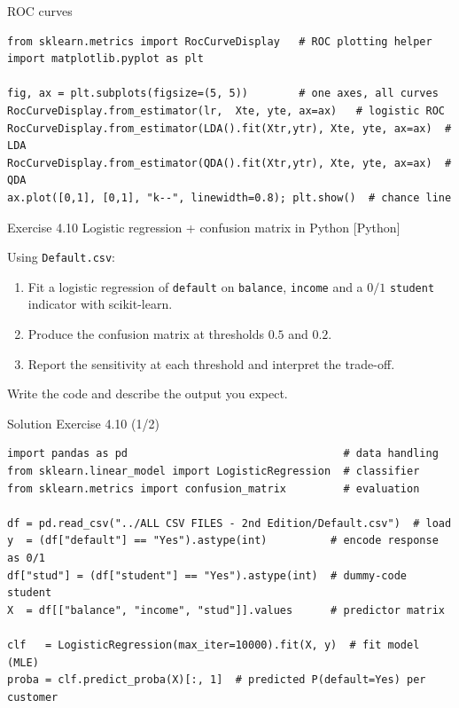 \documentclass[aspectratio=169,11pt]{beamer}
\begin{document}
\begin{frame}[fragile]{ROC curves}
  \begin{lstlisting}
from sklearn.metrics import RocCurveDisplay   # ROC plotting helper
import matplotlib.pyplot as plt

fig, ax = plt.subplots(figsize=(5, 5))        # one axes, all curves
RocCurveDisplay.from_estimator(lr,  Xte, yte, ax=ax)   # logistic ROC
RocCurveDisplay.from_estimator(LDA().fit(Xtr,ytr), Xte, yte, ax=ax)  # LDA
RocCurveDisplay.from_estimator(QDA().fit(Xtr,ytr), Xte, yte, ax=ax)  # QDA
ax.plot([0,1], [0,1], "k--", linewidth=0.8); plt.show()  # chance line
  \end{lstlisting}
\end{frame}




\begin{frame}{Exercise 4.10 \textemdash{} Logistic regression + confusion matrix in Python [Python]}
\begin{exercise}
Using \texttt{Default.csv}:
\begin{enumerate}
  \item Fit a logistic regression of \texttt{default} on
        \texttt{balance}, \texttt{income} and a $0/1$ \texttt{student}
        indicator with scikit-learn.
  \item Produce the confusion matrix at thresholds $0.5$ and $0.2$.
  \item Report the sensitivity at each threshold and interpret the
        trade-off.
\end{enumerate}
Write the code and describe the output you expect.
\end{exercise}
\end{frame}

\begin{frame}[fragile]{Solution \textemdash{} Exercise 4.10 (1/2)}
\begin{solutionbox}
\begin{lstlisting}
import pandas as pd                                  # data handling
from sklearn.linear_model import LogisticRegression  # classifier
from sklearn.metrics import confusion_matrix         # evaluation

df = pd.read_csv("../ALL CSV FILES - 2nd Edition/Default.csv")  # load
y  = (df["default"] == "Yes").astype(int)          # encode response as 0/1
df["stud"] = (df["student"] == "Yes").astype(int)  # dummy-code student
X  = df[["balance", "income", "stud"]].values      # predictor matrix

clf   = LogisticRegression(max_iter=10000).fit(X, y)  # fit model (MLE)
proba = clf.predict_proba(X)[:, 1]  # predicted P(default=Yes) per customer
\end{lstlisting}
\end{solutionbox}
\end{frame}
\end{document}
